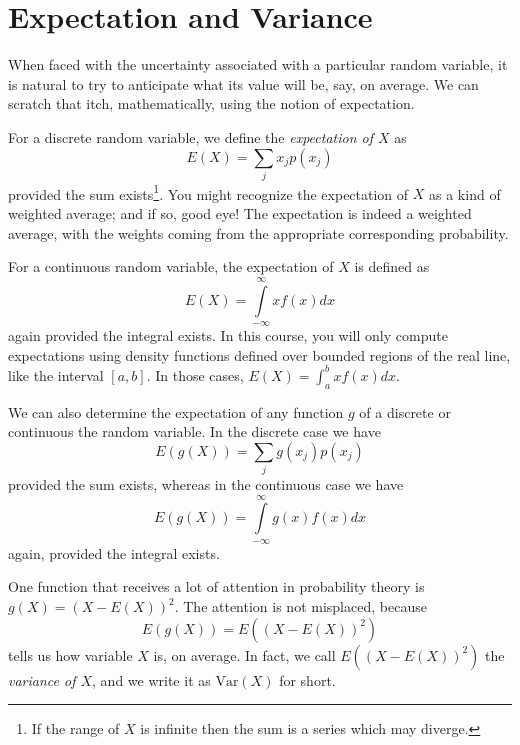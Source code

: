 \documentclass[../book.tex]{subfiles}
\begin{document}
\section{Expectation and Variance}

When faced with the uncertainty associated with a particular random variable, it is natural to try to anticipate what its value will be, say, on average. We can scratch that itch, mathematically, using the notion of expectation.

For a discrete random variable, we define the \emph{expectation of \(X\)} as
\begin{equation}\label{eq:rv-13}
E(X) = \sum_j x_j  p(x_j) 
\end{equation}
provided the sum exists\footnote{If the range of \(X\) is infinite then the sum is a series which may diverge.}. You might recognize the expectation of \(X\) as a kind of weighted average; and if so, good eye! The expectation is indeed a weighted average, with the weights coming from the appropriate corresponding probability.

For a continuous random variable, the expectation of \(X\) is defined as
\begin{equation}\label{eq:rv-14}
E(X) =
\int\limits_{-\infty}^\infty x f(x) dx
\end{equation}
again provided the integral exists. In this course, you will only compute expectations using density functions defined over bounded regions of the real line, like the interval \([a,b]\). In those cases, \(E(X) = \int_a^b x f(x) dx\).

We can also determine the expectation of any function \(g\) of a discrete or continuous the random variable. In the discrete case we have
\begin{equation}\label{eq:rv-15}
E(g(X)) = \sum_j g(x_j) p(x_j)
\end{equation}
provided the sum exists, whereas in the continuous case we have
\begin{equation}\label{eq:rv-16}
E(g(X)) = \int\limits_{-\infty}^\infty g(x) f(x) dx
\end{equation}
again, provided the integral exists.

One function that receives a lot of attention in probability theory is \(g(X) = (X - E(X))^2\). The attention is not misplaced, because
\begin{equation}\label{eq:rv-17}
E(g(X)) = E( (X-E(X))^2  )
\end{equation}
tells us how variable \(X\) is, on average. In fact, we call \(E( (X-E(X))^2  )\) the \emph{variance of \(X\)}, and we write it as \(\text{Var}(X)\) for short.
\end{document}
